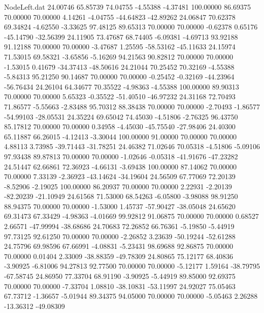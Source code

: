 \begin{filecontents}{NodeLeft.dat}
  24.00746   65.85739   74.04755    -4.55388   -4.37481  100.00000   86.69375   70.00000   70.00000    4.14261   -4.04755  -44.64823  -42.89262
  24.06847   70.62378   69.34824    -4.62550   -3.33625   97.48125   89.65313   70.00000   70.00000   -0.62378    0.65176  -45.14790  -32.56399
  24.11905   73.47687   68.74405    -6.09381   -4.69713   93.92188   91.12188   70.00000   70.00000   -3.47687    1.25595  -58.53162  -45.11633
  24.15974   71.53015   69.58321    -3.65856   -5.16269   94.21563   90.82812   70.00000   70.00000   -1.53015    0.41679  -34.37413  -48.50616
  24.21044   70.25452   70.32169    -4.55388   -5.84313   95.21250   90.14687   70.00000   70.00000   -0.25452   -0.32169  -44.23964  -56.76434
  24.26104   64.34677   70.35522    -4.98363   -4.55388  100.00000   89.90313   70.00000   70.00000    5.65323   -0.35522  -51.40510  -46.97232
  24.31168   72.70493   71.86577    -5.55663   -2.83488   95.70312   88.38438   70.00000   70.00000   -2.70493   -1.86577  -54.99103  -28.05531
  24.35224   69.65042   74.45030    -4.51806   -2.76325   96.43750   85.17812   70.00000   70.00000    0.34958   -4.45030  -45.75540  -27.98406
  24.40300   65.11887   66.26015    -4.12413   -3.30044  100.00000   91.00000   70.00000   70.00000    4.88113    3.73985  -39.71443  -31.78251
  24.46382   71.02646   70.05318    -4.51806   -5.09106   97.93438   89.87813   70.00000   70.00000   -1.02646   -0.05318  -41.91676  -47.23282
  24.51447   62.66861   72.36923    -4.66131   -3.69438  100.00000   87.14062   70.00000   70.00000    7.33139   -2.36923  -43.14624  -34.19604
  24.56509   67.77069   72.20139    -8.52906   -2.19025  100.00000   86.20937   70.00000   70.00000    2.22931   -2.20139  -82.20239  -21.10949
  24.61568   71.53000   68.54263    -6.05800   -3.98088   98.91250   88.94375   70.00000   70.00000   -1.53000    1.45737  -57.90427  -38.05048
  24.65620   69.31473   67.33429    -4.98363   -4.01669   99.92812   91.06875   70.00000   70.00000    0.68527    2.66571  -47.99994  -38.68686
  24.70683   72.26852   66.76361    -5.19850   -5.44919   97.73125   92.61250   70.00000   70.00000   -2.26852    3.23639  -50.19244  -52.61288
  24.75796   69.98596   67.66991    -4.08831   -5.23431   98.69688   92.86875   70.00000   70.00000    0.01404    2.33009  -38.88359  -49.78309
  24.80865   75.12177   68.40836    -3.90925   -6.81006   94.27813   92.77500   70.00000   70.00000   -5.12177    1.59164  -38.79795  -67.58745
  24.86950   77.33704   68.91190    -3.90925   -5.44919   89.85000   92.69375   70.00000   70.00000   -7.33704    1.08810  -38.10831  -53.11997
  24.92027   75.05463   67.73712    -1.36657   -5.01944   89.34375   94.05000   70.00000   70.00000   -5.05463    2.26288  -13.36312  -49.08309

\end{filecontents}
